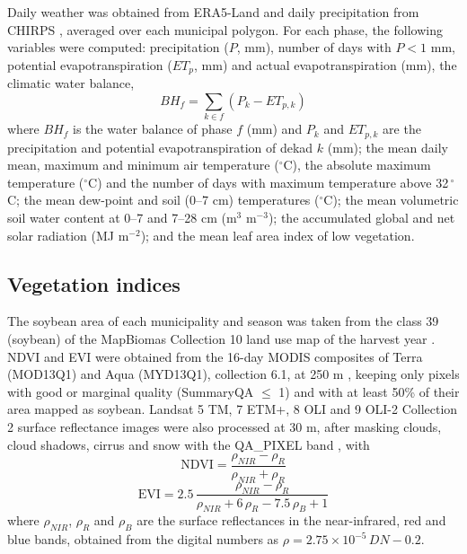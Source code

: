 \documentclass[pdflatex,sn-basic]{sn-jnl}
\begin{document}
Daily weather was obtained from ERA5-Land \citep{munozsabater2021} and daily precipitation from CHIRPS \citep{funk2015}, averaged over each municipal polygon. For each phase, the following variables were computed: precipitation ($P$, mm), number of days with $P < 1$ mm, potential evapotranspiration ($ET_p$, mm) and actual evapotranspiration (mm), the climatic water balance,
\begin{equation}
BH_f = \sum_{k \in f} \left( P_k - ET_{p,k} \right) \label{eq:bh}
\end{equation}
where $BH_f$ is the water balance of phase $f$ (mm) and $P_k$ and $ET_{p,k}$ are the precipitation and potential evapotranspiration of dekad $k$ (mm); the mean daily mean, maximum and minimum air temperature ($^\circ$C), the absolute maximum temperature ($^\circ$C) and the number of days with maximum temperature above 32\,$^\circ$C; the mean dew-point and soil (0--7 cm) temperatures ($^\circ$C); the mean volumetric soil water content at 0--7 and 7--28 cm (m$^3$ m$^{-3}$); the accumulated global and net solar radiation (MJ m$^{-2}$); and the mean leaf area index of low vegetation.

\subsection{Vegetation indices}\label{sec:veg}
The soybean area of each municipality and season was taken from the class 39 (soybean) of the MapBiomas Collection 10 land use map of the harvest year \citep{souza2020}. NDVI and EVI were obtained from the 16-day MODIS composites of Terra (MOD13Q1) and Aqua (MYD13Q1), collection 6.1, at 250 m \citep{didan2021mod,didan2021myd}, keeping only pixels with good or marginal quality (SummaryQA $\le$ 1) and with at least 50\% of their area mapped as soybean. Landsat 5 TM, 7 ETM+, 8 OLI and 9 OLI-2 Collection 2 surface reflectance images were also processed at 30 m, after masking clouds, cloud shadows, cirrus and snow with the QA\_PIXEL band \citep{foga2017}, with
\begin{equation}
\mathrm{NDVI} = \frac{\rho_{NIR} - \rho_{R}}{\rho_{NIR} + \rho_{R}} \label{eq:ndvi}
\end{equation}
\begin{equation}
\mathrm{EVI} = 2.5\,\frac{\rho_{NIR} - \rho_{R}}{\rho_{NIR} + 6\,\rho_{R} - 7.5\,\rho_{B} + 1} \label{eq:evi}
\end{equation}
where $\rho_{NIR}$, $\rho_{R}$ and $\rho_{B}$ are the surface reflectances in the near-infrared, red and blue bands, obtained from the digital numbers as $\rho = 2.75\times10^{-5}\,DN - 0.2$.
\end{document}
